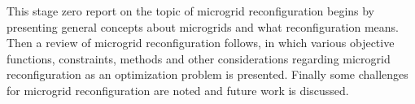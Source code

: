 \begin{Abstract}
This stage zero report on the topic of microgrid reconfiguration begins by presenting general concepts about microgrids and what reconfiguration means. Then a review of microgrid reconfiguration follows, in which various objective functions, constraints, methods and other considerations regarding microgrid reconfiguration as an optimization problem is presented. Finally some challenges for microgrid reconfiguration are noted and future work is discussed.
%
%
%
%
%
\end{Abstract}

